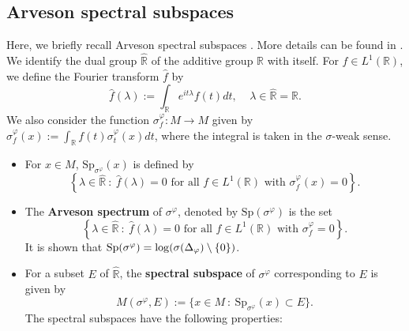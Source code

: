 \documentclass[12pt]{amsart}
\theoremstyle{definition}
\DeclareMathOperator{\Sp}{Sp}
\begin{document}
\subsection{Arveson spectral subspaces}\label{subsec spectralsubspace}
Here, we briefly recall Arveson spectral subspaces \cite{Arveson74}. More details can be found in  \cite[Chapter XI]{takesakiII}. 
We identify the dual group $\widehat{\mathbb{R}}$ of the additive group $\mathbb{R}$ with itself. For $f\in L^1(\mathbb{R})$, we define the Fourier transform $\hat{f}$  by 
\[\hat{f}(\lambda):=\int_{\mathbb{R}}e^{it\lambda}f(t)dt,\ \ \ \ \ \lambda \in \widehat{\mathbb{R}}=\mathbb{R}.\]
We also consider the function $\sigma_f^\varphi:M\to M$ given by $\sigma_f^{\varphi}(x):=\int_{\mathbb{R}}f(t)\sigma_t^{\varphi}(x)dt$, where the integral is taken in the $\sigma$-weak sense.
\begin{itemize}
\item[(1)] 
For $x\in M$, $\text{Sp}_{\sigma^{\varphi}}(x)$ is defined by
\[\left \{\lambda \in \widehat{\mathbb{R}} \ : \ \hat{f}(\lambda)=0 \text{  for all } f\in L^1(\mathbb{R}) \text{  with  }\sigma^{\varphi}_f(x)=0\right \}.\] 
\item[(2)] The \textbf{Arveson spectrum} of $\sigma^{\varphi}$, denoted by $\text{Sp}(\sigma^{\varphi})$ is the set
\[\left \{\lambda \in \widehat{\mathbb{R}} \ : \ \hat{f}(\lambda)=0 \text{  for all } f\in L^1(\mathbb{R}) \text{  with  }\sigma^{\varphi}_f=0\right \}.\]
It is shown that ${\rm{Sp}}(\sigma^{\varphi})=\log (\sigma(\Delta_{\varphi})\setminus \{0\})$. 
\item[(3)] For a subset $E$ of $\widehat{\mathbb{R}}$, the \textbf{spectral subspace} of $\sigma^{\varphi}$ corresponding to $E$ is given by 
\[M(\sigma^{\varphi},E):=\{x\in M \ :\ \text{Sp}_{\sigma^{\varphi}}(x)\subset E\}.\]
The spectral subspaces have the following properties:
\end{itemize}
\end{document}
